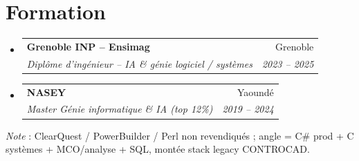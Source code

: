 \documentclass[a4paper,10.5pt]{article}
\makeatletter
\newcommand{\resumeSubheading}[4]{\vspace{2.5pt}\item\begin{tabular*}{0.97\textwidth}[t]{l@{\extracolsep{\fill}}r}\textbf{#1}&{#2}\\\textit{\small #3}&\textit{\small #4}\\\end{tabular*}\vspace{1pt}}
\newcommand{\resumeSubHeadingListStart}{\begin{itemize}[leftmargin=0.08in,label={}]}
\newcommand{\resumeSubHeadingListEnd}{\end{itemize}}
\makeatother
\begin{document}
\section{Formation}
\resumeSubHeadingListStart
  \resumeSubheading{Grenoble INP -- Ensimag}{Grenoble}{Dipl\^ome d'ing\'enieur -- IA \& g\'enie logiciel / syst\`emes}{2023 -- 2025}
  \resumeSubheading{NASEY}{Yaound\'e}{Master G\'enie informatique \& IA (top 12\%)}{2019 -- 2024}
\resumeSubHeadingListEnd

\vspace{3pt}
\small{\textit{Note} : ClearQuest / PowerBuilder / Perl non revendiqu\'es ; angle = C\# prod + C syst\`emes + MCO/analyse + SQL, mont\'ee stack legacy CONTROCAD.}
\end{document}
